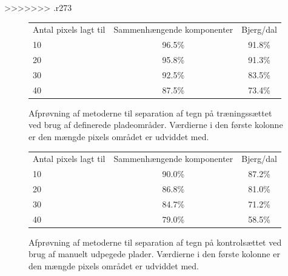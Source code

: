 >>>>>>> .r273

\begin{figure}[htp]
\centering
\begin{tabular}{|l|c|c|}\hline
\rowcolor[gray]{0.9} \multicolumn{3}{|>{\columncolor[gray]{0.9}}c|}{\textbf{Separation af tegn - Træningssæt}} \\ \hline
Antal pixels lagt til & Sammenhængende komponenter & Bjerg/dal \\\hline
10 & 96.5\% & 91.8\% \\\hline
20 & 95.8\% & 91.3\% \\\hline
30 & 92.5\% & 83.5\% \\\hline
40 & 87.5\% & 73.4\% \\\hline \end{tabular}
\caption{Afprøvning af metoderne til separation af tegn på træningssættet ved brug af definerede pladeområder. Værdierne i den første kolonne er den mængde pixels området er udviddet med.}
\label{fig:test:sep-traening-manuel}
\end{figure}

\begin{figure}[htp]
\centering
\begin{tabular}{|l|c|c|}\hline
\rowcolor[gray]{0.9} \multicolumn{3}{|>{\columncolor[gray]{0.9}}c|}{\textbf{Separation af tegn - Kontrolsæt}} \\ \hline
Antal pixels lagt til & Sammenhængende komponenter & Bjerg/dal \\\hline
10 & 90.0\% & 87.2\% \\\hline
20 & 86.8\% & 81.0\% \\\hline
30 & 84.7\% & 71.2\% \\\hline
40 & 79.0\% & 58.5\% \\\hline \end{tabular}
\caption{Afprøvning af metoderne til separation af tegn på kontrolsættet ved brug af manuelt udpegede plader. Værdierne i den første kolonne er den mængde pixels området er udviddet med.}
\label{fig:test:sep-kontrol-manuel}
\end{figure}


